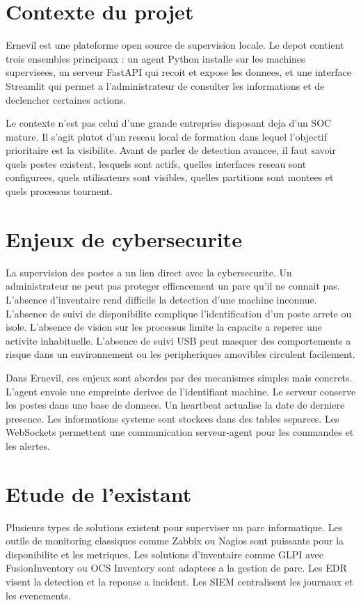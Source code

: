 \documentclass[12pt,a4paper]{report}
\begin{document}
\section{Contexte du projet}
Ernevil est une plateforme open source de supervision locale. Le depot contient trois ensembles principaux : un agent Python installe sur les machines supervisees, un serveur FastAPI qui recoit et expose les donnees, et une interface Streamlit qui permet a l'administrateur de consulter les informations et de declencher certaines actions.

Le contexte n'est pas celui d'une grande entreprise disposant deja d'un SOC mature. Il s'agit plutot d'un reseau local de formation dans lequel l'objectif prioritaire est la visibilite. Avant de parler de detection avancee, il faut savoir quels postes existent, lesquels sont actifs, quelles interfaces reseau sont configurees, quels utilisateurs sont visibles, quelles partitions sont montees et quels processus tournent.

\section{Enjeux de cybersecurite}
La supervision des postes a un lien direct avec la cybersecurite. Un administrateur ne peut pas proteger efficacement un parc qu'il ne connait pas. L'absence d'inventaire rend difficile la detection d'une machine inconnue. L'absence de suivi de disponibilite complique l'identification d'un poste arrete ou isole. L'absence de vision sur les processus limite la capacite a reperer une activite inhabituelle. L'absence de suivi USB peut masquer des comportements a risque dans un environnement ou les peripheriques amovibles circulent facilement.

Dans Ernevil, ces enjeux sont abordes par des mecanismes simples mais concrets. L'agent envoie une empreinte derivee de l'identifiant machine. Le serveur conserve les postes dans une base de donnees. Un heartbeat actualise la date de derniere presence. Les informations systeme sont stockees dans des tables separees. Les WebSockets permettent une communication serveur-agent pour les commandes et les alertes.

\section{Etude de l'existant}
Plusieurs types de solutions existent pour superviser un parc informatique. Les outils de monitoring classiques comme Zabbix ou Nagios sont puissants pour la disponibilite et les metriques. Les solutions d'inventaire comme GLPI avec FusionInventory ou OCS Inventory sont adaptees a la gestion de parc. Les EDR visent la detection et la reponse a incident. Les SIEM centralisent les journaux et les evenements.
\end{document}
